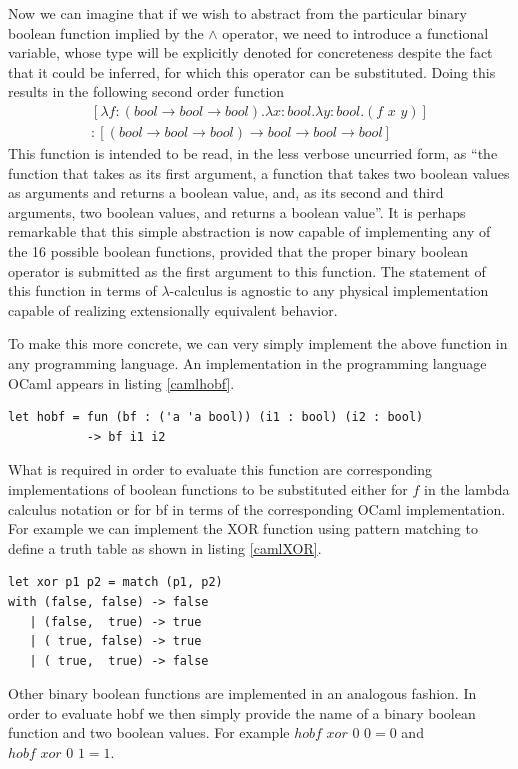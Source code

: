 Now we can imagine that if we wish to abstract from the particular
binary boolean function implied by the
$\wedge$ operator, we need to introduce a
functional variable, whose type will be explicitly denoted for
concreteness despite the fact that it could be inferred, for which this
operator can be substituted. Doing this results in the following second
order function
\begin{multline}\label{eq:lamhobf}
[\lambda f:(bool \rightarrow bool \rightarrow bool).
\lambda x:bool. \lambda y:bool.(f\,\,x\,\,y)]
\\
:[(bool \rightarrow bool \rightarrow bool)
\rightarrow bool \rightarrow bool \rightarrow bool]
\end{multline}
This function is intended to be read, in the less verbose uncurried
form, as ``the function that takes as its first argument, a function
that takes two boolean values as arguments and returns a boolean value,
and, as its second and third arguments, two boolean values, and returns a
boolean value''. It is perhaps remarkable that this simple abstraction
is now capable of implementing any of the 16 possible boolean functions,
provided that the proper binary boolean operator is submitted as the
first argument to this function. The statement of this
function in terms of $\lambda$-calculus is agnostic to any physical implementation capable of realizing extensionally
equivalent behavior.

To make this more concrete, we can very simply implement the above
function in any programming language.
An implementation in the programming language OCaml appears in listing \ref{camlhobf}.
\begin{lstlisting}[caption={a higher order boolean function},label=camlhobf]
let hobf = fun (bf : ('a 'a bool)) (i1 : bool) (i2 : bool)
	       -> bf i1 i2
\end{lstlisting}
What is required in order to evaluate this function are corresponding
implementations of boolean functions to be substituted either for
$f$ in the lambda calculus notation or
for bf in terms of the corresponding OCaml implementation. For example
we can implement the XOR function using pattern matching to define a
truth table as shown in listing \ref{camlXOR}.
\begin{lstlisting}[caption={implementation of an XOR boolean operator},label=camlXOR]
let xor p1 p2 = match (p1, p2)
with (false, false) -> false
   | (false,  true) -> true
   | ( true, false) -> true
   | ( true,  true) -> false
\end{lstlisting}
Other binary boolean functions are implemented in an analogous fashion.
In order to evaluate hobf we then simply provide the name of a binary
boolean function and two boolean values. For example $hobf \,\, xor \,\, 0 \,\, 0=0$ and $hobf \,\, xor \,\, 0 \,\, 1=1$.

